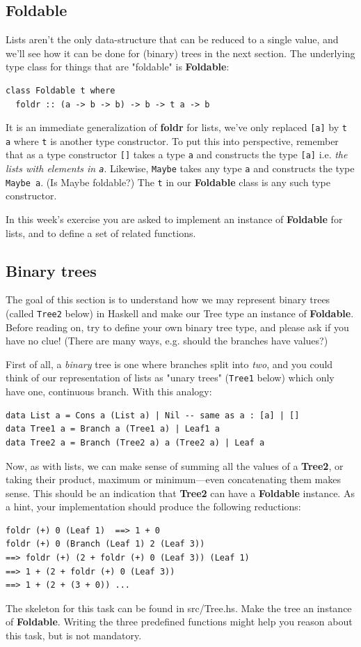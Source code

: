 \documentclass{article}
\begin{document}
\subsection{Foldable}
Lists aren't the only data-structure that can be reduced to a single value, and we'll see how it can be done for (binary) trees in the next section. The underlying type class for things that are "foldable" is \textbf{Foldable}:
\begin{lstlisting}
class Foldable t where
  foldr :: (a -> b -> b) -> b -> t a -> b
\end{lstlisting}
It is an immediate generalization of \textbf{foldr} for lists, we've only replaced \texttt{[a]} by \texttt{t a} where \texttt{t} is another type constructor. To put this into perspective, remember that as a type constructor \texttt{[]} takes a type \texttt{a} and constructs the type \texttt{[a]} i.e. \emph{the lists with elements in \texttt{a}}. Likewise, \texttt{Maybe} takes any type \texttt{a} and constructs the type \texttt{Maybe a}. (Is Maybe foldable?) The \texttt{t} in our \textbf{Foldable} class is any such type constructor.

In this week's exercise you are asked to implement an instance of \textbf{Foldable} for lists, and to define a set of related functions.

\subsection{Binary trees}
The goal of this section is to understand how we may represent binary trees (called \texttt{Tree2} below) in Haskell and make our Tree type an instance of \textbf{Foldable}. Before reading on, try to define your own binary tree type, and please ask if you have no clue! (There are many ways, e.g. should the branches have values?)

First of all, a \emph{binary} tree is one where branches split into \emph{two}, and you could think of our representation of lists as "unary trees" (\texttt{Tree1} below) which only have one, continuous branch. With this analogy:
\begin{lstlisting}
data List a = Cons a (List a) | Nil -- same as a : [a] | []
data Tree1 a = Branch a (Tree1 a) | Leaf1 a
data Tree2 a = Branch (Tree2 a) a (Tree2 a) | Leaf a
\end{lstlisting}
Now, as with lists, we can make sense of summing all the values of a \textbf{Tree2}, or taking their product, maximum or minimum---even concatenating them makes sense. This should be an indication that \textbf{Tree2} can have a \textbf{Foldable} instance. As a hint, your implementation should produce the following reductions:
\begin{lstlisting}
foldr (+) 0 (Leaf 1)  ==> 1 + 0
foldr (+) 0 (Branch (Leaf 1) 2 (Leaf 3))
==> foldr (+) (2 + foldr (+) 0 (Leaf 3)) (Leaf 1)
==> 1 + (2 + foldr (+) 0 (Leaf 3))
==> 1 + (2 + (3 + 0)) ...
\end{lstlisting}
The skeleton for this task can be found in src/Tree.hs. Make the tree an instance of \textbf{Foldable}. Writing the three predefined functions might help you reason about this task, but is not mandatory.
\end{document}

